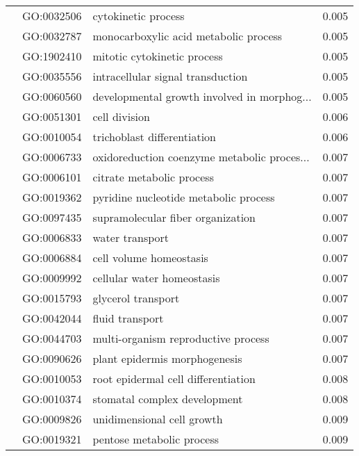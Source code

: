 \begin{longtable}{lllr}
   & GO:0032506 &                          cytokinetic process &         0.005 \\
   & GO:0032787 &        monocarboxylic acid metabolic process &         0.005 \\
   & GO:1902410 &                  mitotic cytokinetic process &         0.005 \\
   & GO:0035556 &            intracellular signal transduction &         0.005 \\
   & GO:0060560 &  developmental growth involved in morphog... &         0.005 \\
   & GO:0051301 &                                cell division &         0.006 \\
   & GO:0010054 &                  trichoblast differentiation &         0.006 \\
   & GO:0006733 &  oxidoreduction coenzyme metabolic proces... &         0.007 \\
   & GO:0006101 &                    citrate metabolic process &         0.007 \\
   & GO:0019362 &        pyridine nucleotide metabolic process &         0.007 \\
   & GO:0097435 &            supramolecular fiber organization &         0.007 \\
   & GO:0006833 &                              water transport &         0.007 \\
   & GO:0006884 &                      cell volume homeostasis &         0.007 \\
   & GO:0009992 &                   cellular water homeostasis &         0.007 \\
   & GO:0015793 &                           glycerol transport &         0.007 \\
   & GO:0042044 &                              fluid transport &         0.007 \\
   & GO:0044703 &          multi-organism reproductive process &         0.007 \\
   & GO:0090626 &                plant epidermis morphogenesis &         0.007 \\
   & GO:0010053 &          root epidermal cell differentiation &         0.008 \\
   & GO:0010374 &                 stomatal complex development &         0.008 \\
   & GO:0009826 &                   unidimensional cell growth &         0.009 \\
   & GO:0019321 &                    pentose metabolic process &         0.009 \\

\end{longtable}
